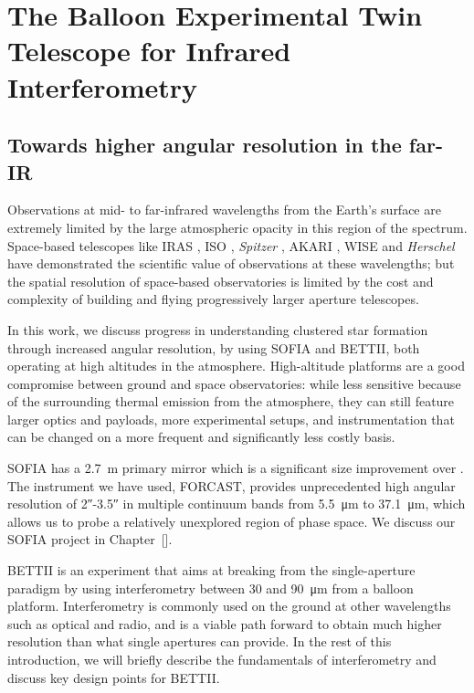 \chapter{The Balloon Experimental Twin Telescope for Infrared Interferometry}
\label{chap:BETTII}

\section{Towards higher angular resolution in the far-IR}
Observations at mid- to far-infrared wavelengths from the Earth's surface are extremely 
limited by the large atmospheric opacity in this region of the spectrum. Space-based telescopes 
like IRAS \citep[12-100 \um;][]{1984ApJ...278L...1N}, ISO \citep[2.5-240 $\um$;][]{1996A&A...315L..27K}, \textit{Spitzer} \citep[3.6-160 $\um$;][]{2004ApJS..154....1W}, AKARI  \citep[1.7-180 $\um$;][]{2007PASJ...59S.369M}, WISE \citep[3.4-22 $\um$;][]{2010AJ....140.1868W} and \textit{Herschel} \citep[55-672 $\um$;][]{2010A&A...518L...1P} have demonstrated the scientific value of observations at 
these wavelengths; but the spatial resolution of space-based observatories is limited by the cost 
and complexity of building and flying progressively larger aperture telescopes. 

In this work, we discuss progress in understanding clustered star formation through increased angular resolution, by using SOFIA and BETTII, both operating at high altitudes in the atmosphere. High-altitude platforms are a good compromise between ground and space observatories: while less sensitive because of the surrounding thermal emission from the atmosphere, they can still feature larger optics and payloads, more experimental setups, and instrumentation that can be changed on a more frequent and significantly less costly basis.

SOFIA has a \SI{2.7}{\meter} primary mirror which is a significant size improvement over \Spitzer. The instrument we have used, FORCAST, provides unprecedented high angular resolution of \ang{;;2}-\ang{;;3.5} in multiple continuum bands from \SI{5.5}{\micro\meter} to \SI{37.1}{\micro\meter}, which allows us to probe a relatively unexplored region of phase space. We discuss our SOFIA project in Chapter~[].

BETTII is an experiment that aims at breaking from the single-aperture paradigm by using interferometry between 30 and \SI{90}{\micro\meter} from a balloon platform. Interferometry is commonly used on the ground at other wavelengths such as optical and radio, and is a viable path forward to obtain much higher resolution than what single apertures can provide. In the rest of this introduction, we will briefly describe the fundamentals of interferometry and discuss key design points for BETTII. 

